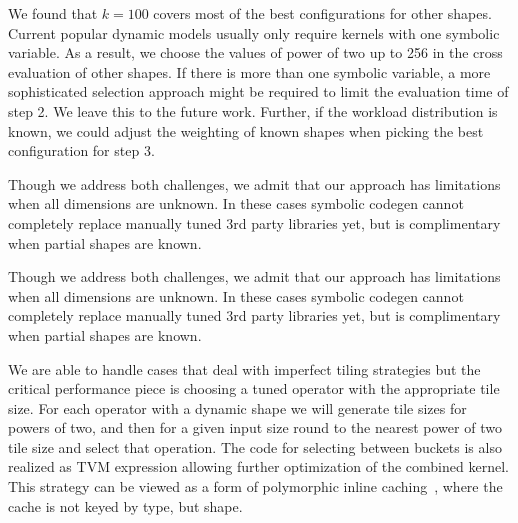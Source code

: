 
We found that $k=100$ covers most of the best configurations for other shapes.
Current popular dynamic models usually only require kernels with one symbolic variable.
As a result, we choose the values of power of two up to 256 in the cross evaluation of other shapes.
If there is more than one symbolic variable, a more sophisticated selection approach might be
  required to limit the evaluation time of step 2.
We leave this to the future work.
Further, if the workload distribution is known, we could adjust the weighting of known shapes when picking the best configuration for step 3.

Though we address both challenges, we admit that our approach has limitations when all dimensions are unknown.
In these cases symbolic codegen cannot completely replace manually tuned 3rd party libraries yet,
  but is complimentary when partial shapes are known.


Though we address both challenges, we admit that our approach has limitations when all dimensions are unknown.
In these cases symbolic codegen cannot completely replace manually tuned 3rd party libraries yet,
  but is complimentary when partial shapes are known.

We are able to handle cases that deal with imperfect tiling strategies but the critical performance piece
  is choosing a tuned operator with the appropriate tile size.
For each operator with a dynamic shape we will generate tile sizes for powers of two,
  and then for a given input size round to the nearest power of two tile size and select that operation.
The code for selecting between buckets is also realized as TVM expression allowing further optimization of the combined kernel.
This strategy can be viewed as a form of polymorphic inline caching~\citep{inline_caches},
  where the cache is not keyed by type, but shape.

